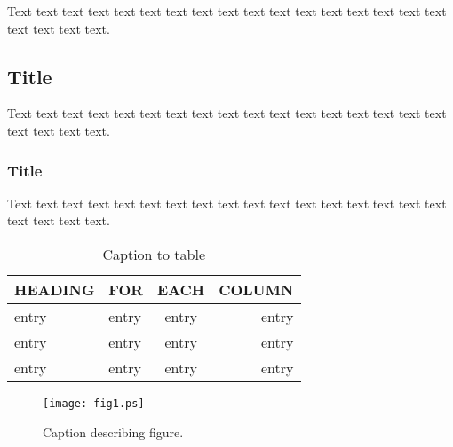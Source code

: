 \documentclass[preprint]{iucr}              %
\begin{document}
Text text text text text text text text text text text text text text
text text text text text text text.

\subsection{Title}

Text text text text text text text text text text text text text text
text text text text text text text.

\subsubsection{Title}

Text text text text text text text text text text text text text text
text text text text text text text.






\begin{references}
\end{references}



\begin{table}
\caption{Caption to table}
\begin{tabular}{llcr}      %
 HEADING    & FOR        & EACH       & COLUMN     \\
\hline
 entry      & entry      & entry      & entry      \\
 entry      & entry      & entry      & entry      \\
 entry      & entry      & entry      & entry      \\
\end{tabular}
\end{table}


\begin{figure}
\caption{Caption describing figure.}
\texttt{[image: fig1.ps]}
\end{figure}
\end{document}
